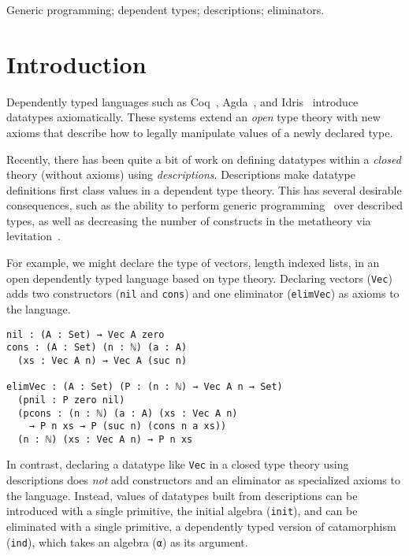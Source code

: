 \documentclass[nonatbib]{sigplanconf}
\begin{document}
\keywords
Generic programming; dependent types; descriptions; eliminators.

\section{Introduction}
\label{sec:intro}
Dependently typed languages such as
{\sc Coq}~\citep{coq08},
{\sc Agda}~\citep{norell2007towards}, and 
{\sc Idris}~\citep{brady2011idris} 
introduce datatypes axiomatically.
These systems extend an {\it open} type theory with new axioms that
describe how to legally manipulate values of a newly declared type.


Recently, there has been quite a bit of work on defining datatypes
within a {\it closed}
theory (without axioms) using {\it descriptions}.
Descriptions make datatype definitions first class values in a
dependent type theory. This has several desirable consequences, such as the
ability to perform generic programming~\citep{Chapman:2010:GAL:1932681.1863547,mcbride2010ornamental,dagand:phd}
over described types, as well as decreasing the number of constructs in the
metatheory via
levitation~\citep{Chapman:2010:GAL:1932681.1863547,dagand:phd}. 

For example, we might declare the type of vectors, length indexed
lists, in an open dependently typed language based on
\citet{martin1975intuitionistic} type theory.
Declaring vectors ({\tt Vec})
adds two constructors ({\tt nil} and {\tt cons}) and one
eliminator ({\tt elimVec}) as axioms to the language.

\begin{verbatim}
nil : (A : Set) → Vec A zero
cons : (A : Set) (n : ℕ) (a : A)
  (xs : Vec A n) → Vec A (suc n)

elimVec : (A : Set) (P : (n : ℕ) → Vec A n → Set)
  (pnil : P zero nil)
  (pcons : (n : ℕ) (a : A) (xs : Vec A n)
    → P n xs → P (suc n) (cons n a xs))
  (n : ℕ) (xs : Vec A n) → P n xs
\end{verbatim}

In contrast, declaring a datatype like {\tt Vec} in a closed type
theory using descriptions does {\it not} add constructors and an
eliminator as specialized axioms to the language. Instead, values of
datatypes built from descriptions can be introduced with a single
primitive, the initial algebra ({\tt init}), and can be eliminated with
a single primitive, a dependently typed version of catamorphism
({\tt ind}), which takes an algebra ({\tt α}) as its argument.
\end{document}
